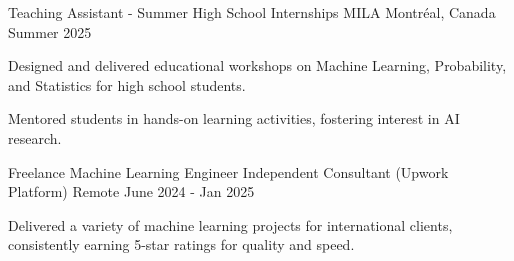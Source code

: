 

\begin{cventries}

    \cventry
    {Teaching Assistant - Summer High School Internships} %
    {MILA} %
    {Montréal, Canada} %
    {Summer 2025} %
    {
      \begin{cvitems} %
        \item {Designed and delivered educational workshops on Machine Learning, Probability, and Statistics for high school students.}
        \item {Mentored students in hands-on learning activities, fostering interest in AI research.}
      \end{cvitems}
    }
    
    \cventry
    {Freelance Machine Learning Engineer} %
    {Independent Consultant (Upwork Platform)} %
    {Remote} %
    {June 2024 - Jan 2025} %
    {
      \begin{cvitems} %
        \item {Delivered a variety of machine learning projects for international clients, consistently earning 5-star ratings for quality and speed.}
      \end{cvitems}
    }


\end{cventries}
